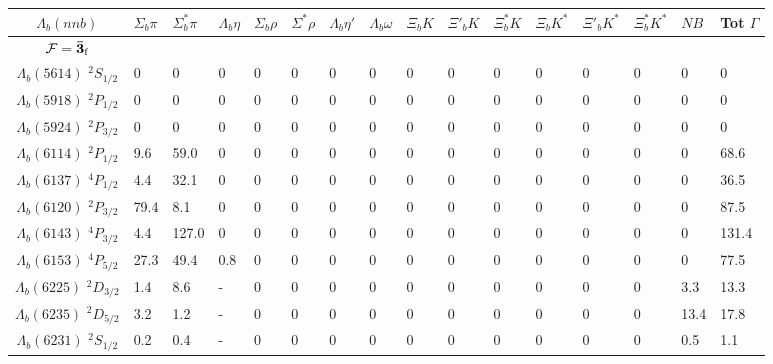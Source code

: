 \begin{tabular}{c |  p{0.58cm}  p{0.58cm}  p{0.58cm}  p{0.58cm}  p{0.58cm}  p{0.58cm}  p{0.58cm}  p{0.58cm}  p{0.58cm}  p{0.58cm}  p{0.58cm}  p{0.58cm}  p{0.58cm}  p{0.58cm}p{0.75cm}} \hline \hline
$\Lambda_b(nnb)$  & $\Sigma_{b} \pi$  & $\Sigma^{*}_{b} \pi$  & $\Lambda_{b} \eta$  & $\Sigma_{b}\rho$  & $\Sigma^{*}\rho$  & $\Lambda_{b}\eta'$  & $\Lambda_{b}\omega$  & $\Xi_{b} K$  & $\Xi'_{b} K$  & $\Xi^{*}_{b} K$  & $\Xi_{b} K^{*}$  & $\Xi'_{b} K^{*}$  & $\Xi^{*}_{b} K^{*}$  & $N B$  & Tot $\Gamma$  \\ \hline
$\mathcal{F}={\bf {\bar{3}}}_{\rm f}$&&&&&&&&&&&&&&\\ \hline
$\Lambda_b(5614)$ $^{2}S_{1/2}$&$0$   &$0$   &$0$   &$0$   &$0$   &$0$   &$0$   &$0$   &$0$   &$0$   &$0$   &$0$   &$0$   &$0$   &$0$  \\
$\Lambda_b(5918)$ $^{2}P_{1/2}$&$0$   &$0$   &$0$   &$0$   &$0$   &$0$   &$0$   &$0$   &$0$   &$0$   &$0$   &$0$   &$0$   &$0$   &$0$  \\
$\Lambda_b(5924)$ $^{2}P_{3/2}$&$0$   &$0$   &$0$   &$0$   &$0$   &$0$   &$0$   &$0$   &$0$   &$0$   &$0$   &$0$   &$0$   &$0$   &$0$  \\
$\Lambda_b(6114)$ $^{2}P_{1/2}$&9.6   &59.0   &$0$   &$0$   &$0$   &$0$   &$0$   &$0$   &$0$   &$0$   &$0$   &$0$   &$0$   &$0$   &68.6  \\
$\Lambda_b(6137)$ $^{4}P_{1/2}$&4.4   &32.1   &$0$   &$0$   &$0$   &$0$   &$0$   &$0$   &$0$   &$0$   &$0$   &$0$   &$0$   &$0$   &36.5  \\
$\Lambda_b(6120)$ $^{2}P_{3/2}$&79.4   &8.1   &$0$   &$0$   &$0$   &$0$   &$0$   &$0$   &$0$   &$0$   &$0$   &$0$   &$0$   &$0$   &87.5  \\
$\Lambda_b(6143)$ $^{4}P_{3/2}$&4.4   &127.0   &$0$   &$0$   &$0$   &$0$   &$0$   &$0$   &$0$   &$0$   &$0$   &$0$   &$0$   &$0$   &131.4  \\
$\Lambda_b(6153)$ $^{4}P_{5/2}$&27.3   &49.4   &0.8   &$0$   &$0$   &$0$   &$0$   &$0$   &$0$   &$0$   &$0$   &$0$   &$0$   &$0$   &77.5  \\
$\Lambda_b(6225)$ $^{2}D_{3/2}$&1.4   &8.6   &-   &$0$   &$0$   &$0$   &$0$   &$0$   &$0$   &$0$   &$0$   &$0$   &$0$   &3.3   &13.3  \\
$\Lambda_b(6235)$ $^{2}D_{5/2}$&3.2   &1.2   &-   &$0$   &$0$   &$0$   &$0$   &$0$   &$0$   &$0$   &$0$   &$0$   &$0$   &13.4   &17.8  \\
$\Lambda_b(6231)$ $^{2}S_{1/2}$&0.2   &0.4   &-   &$0$   &$0$   &$0$   &$0$   &$0$   &$0$   &$0$   &$0$   &$0$   &$0$   &0.5   &1.1  \\

\end{tabular}

